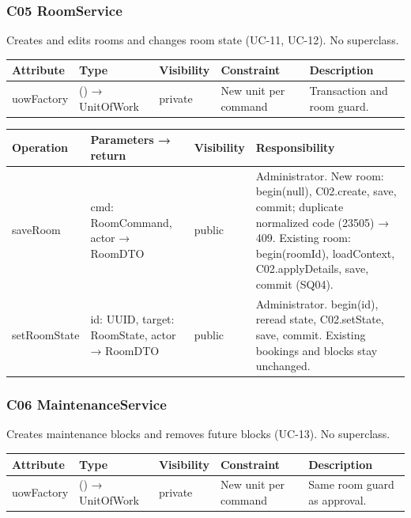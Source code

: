 \subsubsection{C05 RoomService}

Creates and edits rooms and changes room state (UC-11, UC-12). No superclass.\par

\small
\setlength{\tabcolsep}{3pt}
\renewcommand{\arraystretch}{1.12}
\begin{longtable}{|p{}|p{}|p{}|p{}|p{}|}
\hline
\textbf{Attribute} & \textbf{Type} & \textbf{Visibility} & \textbf{Constraint} & \textbf{Description} \\ \hline
\endfirsthead \hline
uowFactory & () → UnitOfWork & private & New unit per command & Transaction and room guard. \\ \hline
\end{longtable}
\normalsize

\small
\setlength{\tabcolsep}{3pt}
\renewcommand{\arraystretch}{1.12}
\begin{longtable}{|p{}|p{}|p{}|p{}|}
\hline
\textbf{Operation} & \textbf{Parameters → return} & \textbf{Visibility} & \textbf{Responsibility} \\ \hline
\endfirsthead \hline
saveRoom & cmd: RoomCommand, actor → RoomDTO & public & Administrator. New room: begin(null), C02.create, save, commit; duplicate normalized code (23505) → 409. Existing room: begin(roomId), loadContext, C02.applyDetails, save, commit (SQ04). \\ \hline
setRoomState & id: UUID, target: RoomState, actor → RoomDTO & public & Administrator. begin(id), reread state, C02.setState, save, commit. Existing bookings and blocks stay unchanged. \\ \hline
\end{longtable}
\normalsize

\subsubsection{C06 MaintenanceService}

Creates maintenance blocks and removes future blocks (UC-13). No superclass.\par

\small
\setlength{\tabcolsep}{3pt}
\renewcommand{\arraystretch}{1.12}
\begin{longtable}{|p{}|p{}|p{}|p{}|p{}|}
\hline
\textbf{Attribute} & \textbf{Type} & \textbf{Visibility} & \textbf{Constraint} & \textbf{Description} \\ \hline
\endfirsthead \hline
uowFactory & () → UnitOfWork & private & New unit per command & Same room guard as approval. \\ \hline
\end{longtable}
\normalsize


